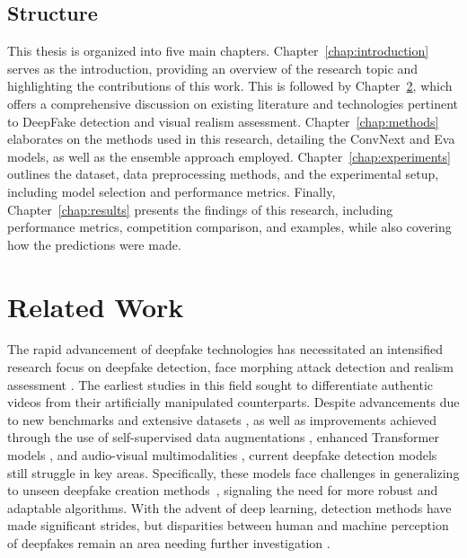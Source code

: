 \documentclass[a4paper,12pt,openright]{book}
\begin{document}
\section{Structure}

This thesis is organized into five main chapters. Chapter~\ref{chap:introduction} serves as the introduction, providing an overview of the research topic and highlighting the contributions of this work. This is followed by Chapter~\ref{chap:related_work}, which offers a comprehensive discussion on existing literature and technologies pertinent to DeepFake detection and visual realism assessment. Chapter~\ref{chap:methods} elaborates on the methods used in this research, detailing the ConvNext and Eva models, as well as the ensemble approach employed. Chapter~\ref{chap:experiments} outlines the dataset, data preprocessing methods, and the experimental setup, including model selection and performance metrics. Finally, Chapter~\ref{chap:results} presents the findings of this research, including performance metrics, competition comparison, and examples, while also covering how the predictions were made.


\chapter{Related Work}
\label{chap:related_work}
The rapid advancement of deepfake technologies has necessitated an intensified research focus on deepfake detection, face morphing attack detection and realism assessment \cite{DBLP:journals/corr/abs-2103-00484, ivanovska2022face}. The earliest studies in this field sought to differentiate authentic videos from their artificially manipulated counterparts. Despite advancements due to new benchmarks and extensive datasets \cite{khalid2022fakeavceleb, DBLP:journals/corr/abs-2103-16076}, as well as improvements achieved through the use of self-supervised data augmentations \cite{shiohara2022detecting}, enhanced Transformer models \cite{ISTVT}, and audio-visual multimodalities \cite{AVoiD}, current deepfake detection models still struggle in key areas. Specifically, these models face challenges in generalizing to unseen deepfake creation methods~\cite{li2023generalizable}, signaling the need for more robust and adaptable algorithms.
With the advent of deep learning, detection methods have made significant strides, but disparities between human and machine perception of deepfakes remain an area needing further investigation \cite{DBLP:journals/corr/abs-2009-03155}.
\end{document}
